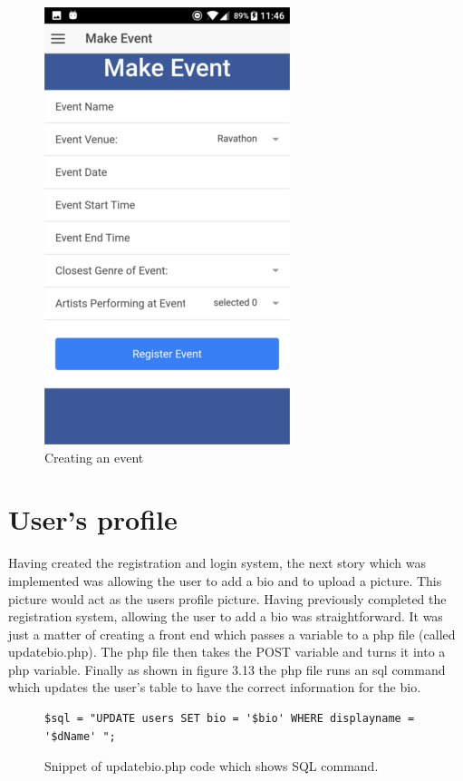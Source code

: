 \begin{center}
\begin{figure}[H]
\includegraphics[scale=0.5]{images/sc18}
\caption{Creating an event}
\end{figure}
\end{center}

\section{User's profile}
Having created the registration and login system, the next story which was implemented was allowing the user to add a bio and to upload a picture. This picture would act as the users profile picture. Having previously completed the registration system, allowing the user to add a bio was straightforward. It was just a matter of creating a front end which passes a variable to a php file (called updatebio.php). The php file then takes the POST variable and turns it into a php variable. Finally as shown in figure 3.13 the php file runs an sql command which updates the user's table to have the correct information for the bio.

\begin{figure}[H]
\begin{verbatim}
$sql = "UPDATE users SET bio = '$bio' WHERE displayname = '$dName' ";
\end{verbatim}
\caption{Snippet of updatebio.php code which shows SQL command.}
\end{figure}

